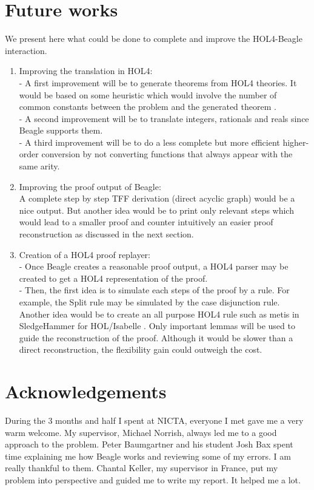 \documentclass[a4paper, 11pt]{article}
\theoremstyle{plain}
\theoremstyle{definition}
\theoremstyle{remark}
\begin{document}
\section{Future works}
We present here what could be done to complete and improve the HOL4-Beagle interaction.
\begin{enumerate}
\item Improving the translation in HOL4:
\\- A first improvement will be to generate theorems from HOL4 theories. 
   It would be based on some heuristic which would involve the number of common constants between the problem and the generated theorem \cite{Paulson10}.
\\- A second improvement will be to translate integers, rationals and reals since Beagle supports them.
\\- A third improvement will be to do a less complete but more efficient higher-order conversion by not converting functions that always appear with the same arity.
 
\item Improving the proof output of Beagle:
\\A complete step by step TFF derivation (direct acyclic graph) would be a nice output. But another idea would be to print only relevant steps which would lead to a smaller proof and counter intuitively an easier proof reconstruction as discussed in the next section. 
 
\item Creation of a HOL4 proof replayer:
\\- Once Beagle creates a reasonable proof output, a HOL4 parser may be created to get a HOL4 representation of the proof.
\\- Then, the first idea is to simulate each steps of the proof by a rule. For example, the Split rule may be simulated by the case disjunction rule.
\\Another idea would be to create an all purpose HOL4 rule such as metis in SledgeHammer for HOL/Isabelle \cite{Paulson10}. Only important lemmas will be used to guide the reconstruction of the proof. Although it would be slower than a direct reconstruction, the flexibility gain could outweigh the cost.
\end{enumerate}

\section{Acknowledgements}
During the 3 months and half I spent at NICTA, everyone I met gave me a very warm welcome. My supervisor, Michael Norrish, always led me to a good approach to the problem. Peter Baumgartner and his student Josh Bax spent time explaining me how Beagle works and reviewing some of my errors. I am really thankful to them. Chantal Keller, my supervisor in France, put my problem into perspective and guided me to write my report. It helped me a lot.

\pagebreak

{}

\end{document}
